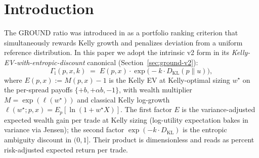 \documentclass[11pt]{article}
\newcommand{\GROUND}{\Gamma_{\mathrm{i}}}
\begin{document}
\section{Introduction}

The GROUND ratio was introduced in \citet{mercurio2020} as a portfolio
ranking criterion that simultaneously rewards Kelly growth and penalizes
deviation from a uniform reference distribution. In this paper we adopt
the intrinsic v2 form in its \emph{Kelly-EV-with-entropic-discount}
canonical (Section~\ref{sec:ground-v2}):
\begin{equation*}
\GROUND(p, x, k) \;=\; E(p, x) \cdot \exp\!\bigl(-k \cdot D_{\mathrm{KL}}(p \| u)\bigr),
\end{equation*}
where $E(p, x) := M(p, x) - 1$ is the Kelly EV at Kelly-optimal sizing
$w^\star$ on the per-spread payoffs $\{+b, +\alpha b, -1\}$, with wealth
multiplier $M = \exp(\ell(w^\star))$ and classical Kelly log-growth
$\ell(w^\star; p, x) = E_p[\ln(1 + w^\star X)]$. The first factor $E$
is the variance-adjusted expected wealth gain per trade at Kelly
sizing (log-utility expectation bakes in variance via Jensen); the
second factor $\exp(-k \cdot D_{\mathrm{KL}})$ is the entropic ambiguity
discount in $(0, 1]$. Their product is dimensionless and reads as
percent risk-adjusted expected return per trade.
\end{document}
